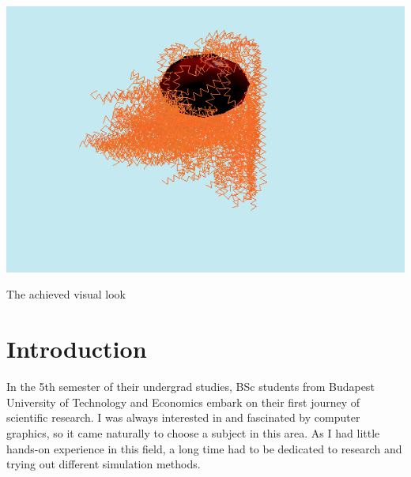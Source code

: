 \documentclass[sigplan,screen,nonacm]{acmart}
\begin{document}

\begin{teaserfigure}
  \includegraphics[width=\textwidth]{teaser_redhead.png}
  \caption{The achieved visual look}
  \label{fig:teaser}
\end{teaserfigure}

\maketitle
\renewcommand{\shortauthors}{Barnabás Börcsök}


\section{Introduction}
In the 5th semester of their undergrad studies, BSc students from Budapest
University of Technology and Economics embark on their first journey of
scientific research. I was always interested in and fascinated by computer 
graphics, so it came naturally to choose a subject in this area. As I had little
 hands-on experience in this field, a long time had to be dedicated
to research and trying out different simulation methods.
\end{document}
